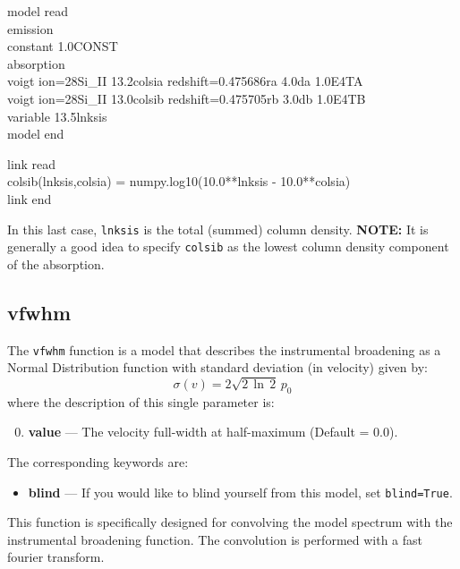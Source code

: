 \vspace{0.3cm}
\begin{mdframed}[style=MyFrame]
model read\\
emission\\
constant 1.0CONST\\
absorption\\
voigt ion=28Si\_II    13.2colsia   redshift=0.475686ra    4.0da   1.0E4TA\\
voigt ion=28Si\_II    13.0colsib   redshift=0.475705rb    3.0db   1.0E4TB\\
variable 13.5lnksis \\
model end\\

\vspace{0.1cm}

\noindent
link read\\
colsib(lnksis,colsia) = numpy.log10(10.0**lnksis - 10.0**colsia)\\
link end\\
\end{mdframed}
\vspace{0.2cm}

In this last case, \texttt{lnksis} is the total (summed) column density. \textbf{NOTE:} It is generally a good idea to specify \texttt{colsib} as the lowest column density component of the absorption.

\subsection{vfwhm}

The \texttt{vfwhm} function is a model that describes the
instrumental broadening as a Normal Distribution function
with standard deviation (in velocity) given by:
\begin{equation}
\sigma(v)=2\sqrt{2\,\ln\,2}\,p_0
\end{equation}
where the description of this single parameter is:
\begin{enumerate}
\setcounter{enumi}{-1}
\item \textbf{value} --- The velocity full-width at half-maximum (Default = 0.0).
\end{enumerate}
The corresponding keywords are:
\begin{itemize}
\item \textbf{blind} --- If you would like to blind yourself from this model, set \texttt{blind=True}.
\end{itemize}
This function is specifically designed for convolving the
model spectrum with the instrumental broadening function.
The convolution is performed with a fast fourier transform.


